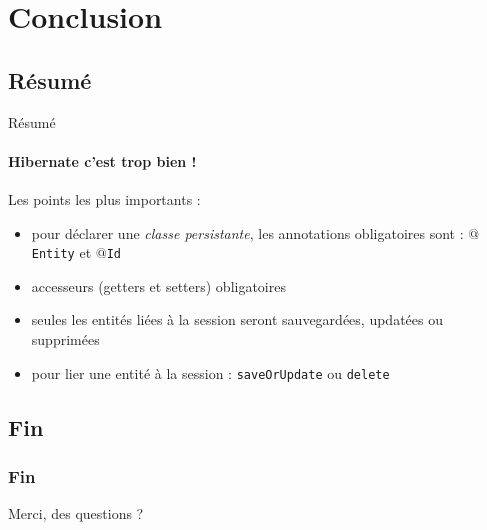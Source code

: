 \documentclass[compress]{beamer}%
\begin{document}
	
	
\section{Conclusion}

\subsection{Résumé}
\begin{frame}{Résumé}
	\framesubtitle{Hibernate c'est trop bien !}
	Les points les plus importants :
	\begin{itemize}[<+->]
		\item pour déclarer une  \emph{classe persistante}, les annotations obligatoires sont : \texttt{$@$Entity} et \texttt{$@$Id}
		\item accesseurs (getters et setters) obligatoires
		\item seules les entités liées à la session seront sauvegardées, updatées ou supprimées
		\item pour lier une entité à la session : \texttt{saveOrUpdate} ou \texttt{delete}
	\end{itemize}
\end{frame}
	
\subsection{Fin}
\begin{frame}
	\frametitle{Fin}
	\begin{center}
		\huge
		Merci, des questions ?
	\end{center}
\end{frame}
\end{document}
